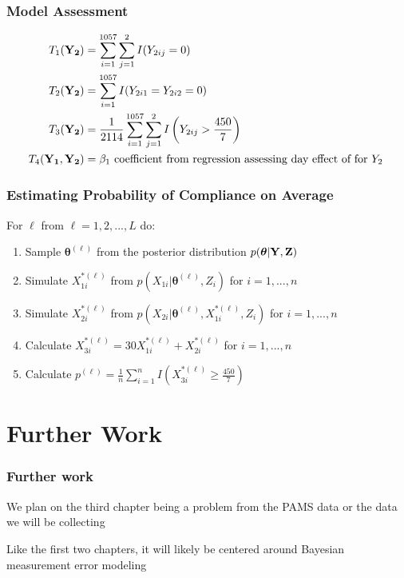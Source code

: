 \documentclass[handout]{beamer}\usepackage[]{graphicx}\usepackage[]{color}
\begin{document}
\begin{frame}
\frametitle{Model Assessment}

\begin{align*}
	T_1({\bf Y_2}) &= \sum_{i=1}^{1057} \sum_{j=1}^{2} I(Y_{2ij} = 0) \\
	T_2({\bf Y_2}) &= \sum_{i=1}^{1057}  I(Y_{2i1} = Y_{2i2} = 0) \\
	T_3({\bf Y_2}) &= \frac{1}{2114} \sum_{i=1}^{1057} \sum_{j=1}^{2} I \left( Y_{2ij} > \frac{450}{7} \right) \\
	T_4({\bf Y_1,Y_2}) &= \beta_1 \text{ coefficient from regression assessing day effect of for $Y_2$ } 
\end{align*}

\end{frame}


\begin{frame}
\frametitle{Estimating Probability of Compliance on Average}

For $\ell$ from $\ell=1,2,...,L$ do:
\begin{enumerate}
\item
Sample $\boldsymbol{\theta}^{(\ell)}$ from the posterior distribution $p(\boldsymbol{\theta}|{\bf Y,Z})$
\item
Simulate ${ X_{1i}^{*(\ell)}}$ from $p(X_{1i}|\boldsymbol{\theta}^{(\ell)},Z_i)$ for $i=1,...,n$
\item
Simulate ${ X_{2i}^{*(\ell)}}$ from $p(X_{2i}|\boldsymbol{\theta}^{(\ell)},X_{1i}^{*(\ell)},Z_i)$ for $i=1,...,n$
\item
Calculate $X_{3i}^{*(\ell)}= 30 X_{1i}^{*(\ell)} + X_{2i}^{*(\ell)}$ for $i=1,...,n$
\item
Calculate $p^{(\ell)} = \frac{1}{n} \sum_{i=1}^{n} I \left( X_{3i}^{*(\ell)} \geq \frac{450}{7} \right) $
\end{enumerate}

\end{frame}

\section{Further Work}
  
\begin{frame}
\frametitle{Further work}

We plan on the third chapter being a problem from the PAMS data or the data we will be collecting

\vspace{0.8cm}

Like the first two chapters, it will likely be centered around Bayesian measurement error modeling

\end{frame}
\end{document}
